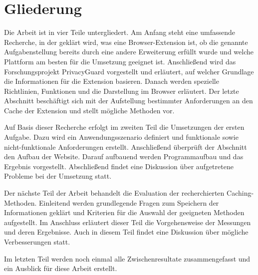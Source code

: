 \section{Gliederung}
\label{s:aufbauderarbeit}

Die Arbeit ist in vier Teile untergliedert. Am Anfang steht eine umfassende Recherche, in der geklärt wird, was eine Browser-Extension ist, ob die genannte Aufgabenstellung bereits durch eine andere Erweiterung erfüllt wurde und welche Plattform am besten für die Umsetzung geeignet ist. Anschließend wird das Forschungsprojekt \glqq PrivacyGuard \grqq{} vorgestellt und erläutert, auf welcher Grundlage die Informationen für die Extension basieren. Danach werden spezielle Richtlinien, Funktionen und die Darstellung im Browser erläutert. Der letzte Abschnitt beschäftigt sich mit der Aufstellung bestimmter Anforderungen an den Cache der Extension und stellt mögliche Methoden vor.

Auf Basis dieser Recherche erfolgt im zweiten Teil die Umsetzungen der ersten Aufgabe. Dazu wird ein Anwendungsszenario definiert und funktionale sowie nicht-funktionale Anforderungen erstellt. Anschließend überprüft der Abschnitt den Aufbau der Website. Darauf aufbauend werden Programmaufbau und das Ergebnis vorgestellt. Abschließend findet eine Diskussion über aufgetretene Probleme bei der Umsetzung statt.

Der nächste Teil der Arbeit behandelt die Evaluation der recherchierten Caching-Methoden. Einleitend werden grundlegende Fragen zum Speichern der Informationen geklärt und Kriterien für die Auswahl der geeigneten Methoden aufgestellt. Im Anschluss erläutert dieser Teil die Vorgehensweise der Messungen und deren Ergebnisse. Auch in diesem Teil findet eine Diskussion über mögliche Verbesserungen statt.

Im letzten Teil werden noch einmal alle Zwischenresultate zusammengefasst und ein Ausblick für diese Arbeit erstellt.
